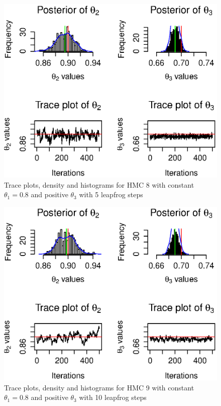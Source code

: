 \documentclass[a4paper,11pt]{article}
\begin{document}
\begin{figure}[H]
\centering
\includegraphics[width=150mm]{hmcplots8_combined.eps}
\caption{Trace plots, density and histograms for HMC 8 with constant $\theta_1 = 0.8$ and positive $\theta_3$ with 5 leapfrog steps}
\end{figure}




\begin{figure}[H]
\centering
\includegraphics[width=150mm]{hmcplots9_combined.eps}
\caption{Trace plots, density and histograms for HMC 9 with constant $\theta_1 = 0.8$ and positive $\theta_3$ with 10 leapfrog steps}
\end{figure}
\end{document}
